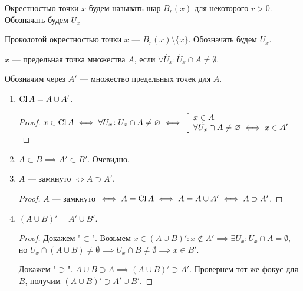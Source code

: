 \begin{definition}
    Окрестностью точки $x$ будем называть шар  $B_r(x)$ для некоторого  $r > 0$. Обозначать будем $U_x$
\end{definition}
\begin{definition}
    Проколотой окрестностью точки $x$ ---  $B_r(x) \setminus \{x\}$. Обозначать будем $\dot{U}_x$.
\end{definition}

\begin{definition}
    $x$ --- предельная точка множества  $A$, если  $\forall \dot{U_x}\!: \dot{U_x} \cap A \neq \emptyset$.

    Обозначим через  $A'$ --- множество предельных точек для  $A$.
\end{definition}
\begin{properties}
    \slashn
    \begin{enumerate}
        \item $\operatorname{Cl} A = A \cup A'$.
            \begin{proof}
                $x \in \operatorname{Cl} A \iff \forall U_x\!: U_x \cap A \neq \varnothing \iff \left[ \begin{array}{l} x \in A \\ \forall \dot{U_x} \cap A \neq \varnothing \iff x \in A' \end{array} \right.$
            \end{proof}
        \item $A \subset B \implies A' \subset B'$. Очевидно.
        \item  $A$ --- замкнуто  $\iff A \supset A'$. 
             \begin{proof}
                $A$ --- замкнуто  $\iff A = \operatorname{Cl} A \iff A = A \cup A' \iff A \supset A'$.
            \end{proof}
        \item $(A \cup B)' = A' \cup B'$.
             \begin{proof}
                Докажем "$\subset$". Возьмем $x \in (A \cup B)'\!: x \notin A' \implies \exists \dot{U_x}\!: \dot{U_x} \cap A = \emptyset$, но $\dot{U_x} \cap (A \cup B) \neq \emptyset \implies \dot{U_x} \cap B \neq \emptyset \implies x \in B'$.

                Докажем "$\supset$". $A \cup B \supset A \implies (A \cup B)' \supset A'$. Провернем тот же фокус для  $B$, получим  $(A \cup B)' \supset A' \cup B'$.
           \end{proof}
    \end{enumerate}
\end{properties}
